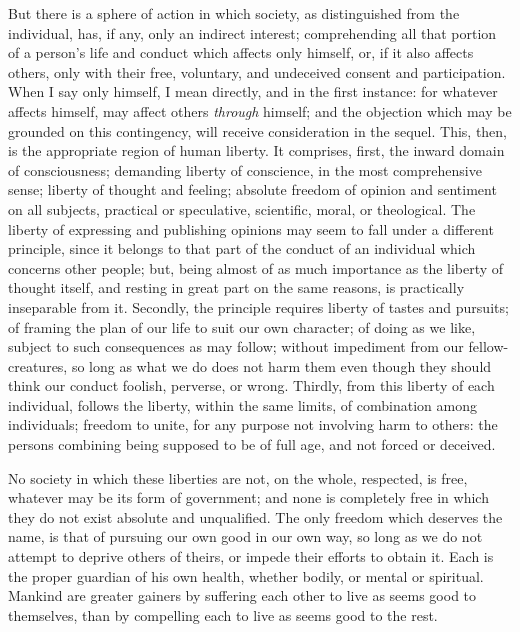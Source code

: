 \documentclass[12pt]{report}
\begin{document}
But there is a sphere of action in which society, as distinguished from the individual, has, if any, only an indirect interest; comprehending all that portion of a person's life and conduct which affects only himself, or, if it also affects others, only with their free, voluntary, and undeceived consent and participation. When I say only himself, I mean directly, and in the first instance: for whatever affects himself, may affect others \emph{through} himself; and the objection which may be grounded on this contingency, will receive consideration in the sequel. This, then, is the appropriate region of human liberty. It comprises, first, the inward domain of consciousness; demanding liberty of conscience, in the most comprehensive sense; liberty of thought and feeling; absolute freedom of opinion and sentiment on all subjects, practical or speculative, scientific, moral, or theological. The liberty of expressing and publishing opinions may seem to fall under a different principle, since it belongs to that part of the conduct of an individual which concerns other people; but, being almost of as much importance as the liberty of thought itself, and resting in great part on the same reasons, is practically inseparable from it. Secondly, the principle requires liberty of tastes and pursuits; of framing the plan of our life to suit our own character; of doing as we like, subject to such consequences as may follow; without impediment from our fellow-creatures, so long as what we do does not harm them even though they should think our conduct foolish, perverse, or wrong. Thirdly, from this liberty of each individual, follows the liberty, within the same limits, of combination among individuals; freedom to unite, for any purpose not involving harm to others: the persons combining being supposed to be of full age, and not forced or deceived.

No society in which these liberties are not, on the whole, respected, is free, whatever may be its form of government; and none is completely free in which they do not exist absolute and unqualified. The only freedom which deserves the name, is that of pursuing our own good in our own way, so long as we do not attempt to deprive others of theirs, or impede their efforts to obtain it. Each is the proper guardian of his own health, whether bodily, or mental or spiritual. Mankind are greater gainers by suffering each other to live as seems good to themselves, than by compelling each to live as seems good to the rest.
\end{document}
